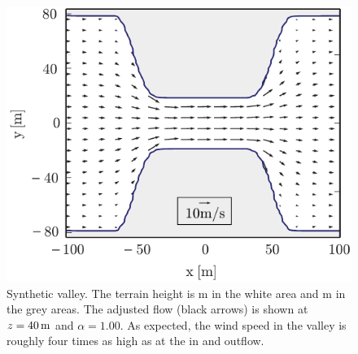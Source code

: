 \documentclass[twocolumn,letterpaper]{IEEEAerospaceCLS}
\begin{document}
\begin{figure}[htbp]
\centering
\includegraphics[width=\columnwidth]{images/WindPred/Results/horizontal_flow_valley.pdf}
\caption{Synthetic valley. The terrain height is \unit[0]{m} in the white area and \unit[100]{m} in the grey areas. The adjusted flow (black arrows) is shown at {$z=\unit[40]{m}$} and $\alpha = 1.00$. As expected, the wind speed in the valley is roughly four times as high as at the in and outflow.}
\label{fig:PL_WindPred_valley_testcase}
\end{figure}
\end{document}
